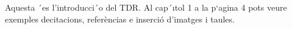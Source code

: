 Aquesta ´es l’introducci´o del TDR. Al cap´ıtol 1 a la p`agina 4 pots veure exemples decitacions, referèncias e inserció d’imatges i taules.
